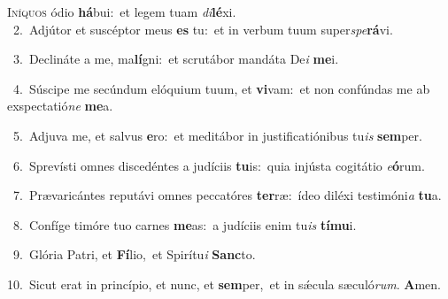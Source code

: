 \lettrine{\initial\textcolor{\initialcolor}{I}}{níquos} ódio \textbf{há}\-bui:~\star et legem tuam \textit{di}\-\textbf{lé}xi.\\
{\numbfont\textcolor{\numbcolor}{~2.}}~Adjútor et suscéptor meus \textbf{es} tu:~\star et in verbum tuum super\-\textit{spe}\-\textbf{rá}vi.\par
{\numbfont\textcolor{\numbcolor}{~3.}}~Declináte a me, ma\-\textbf{lí}\-gni:~\star et scrutábor mandáta De\textit{i} \textbf{me}\-i.\par
{\numbfont\textcolor{\numbcolor}{~4.}}~Súscipe me secúndum elóquium tuum, et \textbf{vi}\-vam:~\star et non confúndas me ab exspectatió\textit{ne} \textbf{me}\-a.\par
{\numbfont\textcolor{\numbcolor}{~5.}}~Adjuva me, et salvus \textbf{e}\-ro:~\star et meditábor in justificatiónibus tu\textit{is} \textbf{sem}\-per.\par
{\numbfont\textcolor{\numbcolor}{~6.}}~Sprevísti omnes discedéntes a judíciis \textbf{tu}\-is:~\star quia injústa cogitátio \textit{e}\-\textbf{ó}rum.\par
{\numbfont\textcolor{\numbcolor}{~7.}}~Prævaricántes reputávi omnes peccatóres \textbf{ter}\-ræ:~\star ídeo diléxi testimóni\textit{a} \textbf{tu}\-a.\par
{\numbfont\textcolor{\numbcolor}{~8.}}~Confíge timóre tuo carnes \textbf{me}\-as:~\star a judíciis enim tu\textit{is} \textbf{tí}\-\textbf{mu}i.\par
{\numbfont\textcolor{\numbcolor}{~9.}}~Glória Patri, et \textbf{Fí}\-lio,~\star et Spirítu\textit{i} \textbf{Sanc}\-to.\par
{\numbfont\textcolor{\numbcolor}{10.}}~Sicut erat in princípio, et nunc, et \textbf{sem}\-per,~\star et in sǽcula sæculó\-\textit{rum}\-. \textbf{A}\-men.\par
